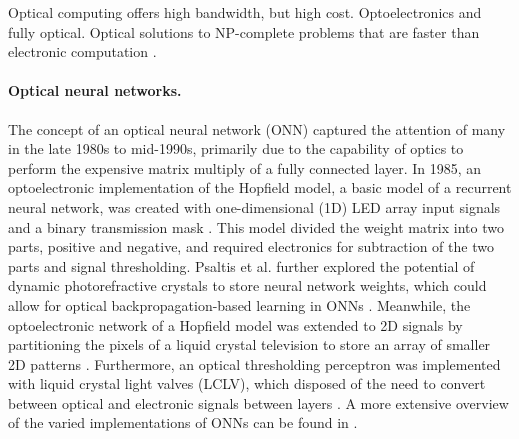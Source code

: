 Optical computing offers high bandwidth, but high cost. Optoelectronics and fully optical. Optical solutions to NP-complete problems that are faster than electronic computation \cite{wu2014optical}.


\paragraph{Optical neural networks.}   The concept of an optical neural network (ONN) captured the attention of many in the late 1980s to mid-1990s, primarily due to the capability of optics to perform the expensive matrix multiply of a fully connected layer. In 1985, an optoelectronic implementation of the Hopfield model, a basic model of a recurrent neural network, was created with one-dimensional (1D) LED array input signals and a binary transmission mask \cite{farhat1985optical}. This model divided the weight matrix into two parts, positive and negative, and required electronics for subtraction of the two parts and signal thresholding. Psaltis et al. further explored the potential of dynamic photorefractive crystals to store neural network weights, which could allow for optical backpropagation-based learning in ONNs \cite{psaltis1988adaptive}. Meanwhile, the optoelectronic network of a Hopfield model was extended to 2D signals by partitioning the pixels of a liquid crystal television to store an array of smaller 2D patterns \cite{lu1989two}. Furthermore, an optical thresholding perceptron was implemented with liquid crystal light valves (LCLV), which disposed of the need to convert between optical and electronic signals between layers \cite{saxena1995adaptive}. A more extensive overview of the varied implementations of ONNs can be found in \cite{denz2013optical}.

